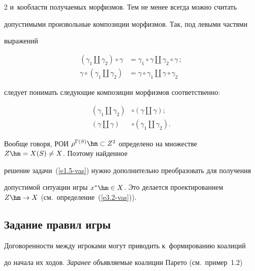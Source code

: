 \begin{multicols}{2}
и~кообласти по\-лу\-ча\-емых морфизмов. Тем не менее всегда можно считать 

до\-пус\-ти\-мы\-ми произвольные композиции морфизмов. Так, под левыми час\-тя\-ми 

выражений 

    \begin{align*}

    \left(\gamma_1\coprod\gamma_2\right) \circ\gamma 

&=\gamma_1\circ\gamma\coprod\gamma_2\circ\gamma\,;\\

    \gamma\circ\left(\gamma_1\coprod\gamma_2\right)&=\gamma\circ\gamma_1\coprod 

\gamma\circ \gamma_2

    \end{align*}

следует понимать сле\-ду\-ющие композиции морфизмов соответственно: 

\begin{align*}

\left(\gamma_1\coprod\gamma_2\right)&\circ\left(\gamma\coprod\gamma\right); \\

\left(\gamma\coprod\gamma\right)&\circ\left( \gamma_1\coprod\gamma_2\right).

\end{align*}

    

    Вообще говоря, РОИ $\rho^{\Gamma(S)} 

\hm\subset Z^2$ определено на множестве $Z\hm= X(S)\not= X$. Поэтому найденное 

решение задачи~(\ref{e1.5-vas}) нуж\-но дополнительно преобразовать для получения 

до\-пус\-ти\-мой ситуации игры $x^*\hm\in X$. Это делается проектированием $Z\hm\to 

X$ (см.\ определение~(\ref{e3.2-vas})). 

    

    \subsection*{Задание правил игры}



    Договоренности между игроками могут приводить к~формированию коалиций 

до начала их ходов. \textit{Заранее} объ\-яв\-ля\-емые коалиции Парето (см.\ пример~1.2) 


\end{multicols}
